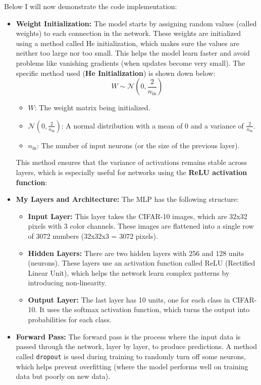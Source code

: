 \documentclass[lettersize,journal]{IEEEtran}
\begin{document}
Below I will now demonstrate the code implementation:
\begin{itemize}
    \item \textbf{Weight Initialization:} 
    The model starts by assigning random values (called weights) to each connection in the network. These weights are initialized using a method called He initialization, which makes sure the values are neither too large nor too small. This helps the model learn faster and avoid problems like vanishing gradients (when updates become very small). The specific method used (\textbf{He Initialization}) is shown down below:
\[
W \sim \mathcal{N}(0, \frac{2}{n_{\text{in}}})
\]
\begin{itemize}
    \item \( W \): The weight matrix being initialized.
    \item \( \mathcal{N}(0, \frac{2}{n_{\text{in}}}) \): A normal distribution with a mean of \( 0 \) and a variance of \( \frac{2}{n_{\text{in}}} \).
    \item \( n_{\text{in}} \): The number of input neurons (or the size of the previous layer).
\end{itemize}
This method ensures that the variance of activations remains stable across layers, which is especially useful for networks using the \textbf{ReLU activation function}:

    \item \textbf{My Layers and Architecture:}
    The MLP has the following structure:
    \begin{itemize}
        \item \textbf{Input Layer:} This layer takes the CIFAR-10 images, which are 32x32 pixels with 3 color channels. These images are flattened into a single row of 3072 numbers (32x32x3 = 3072 pixels).
        \item \textbf{Hidden Layers:} There are two hidden layers with 256 and 128 units (neurons). These layers use an activation function called ReLU (Rectified Linear Unit), which helps the network learn complex patterns by introducing non-linearity.
        \item \textbf{Output Layer:} The last layer has 10 units, one for each class in CIFAR-10. It uses the softmax activation function, which turns the output into probabilities for each class.
    \end{itemize}

    \item \textbf{Forward Pass:}
    The forward pass is the process where the input data is passed through the network, layer by layer, to produce predictions. A method called \texttt{dropout} is used during training to randomly turn off some neurons, which helps prevent overfitting (where the model performs well on training data but poorly on new data).


\end{itemize}
\end{document}
